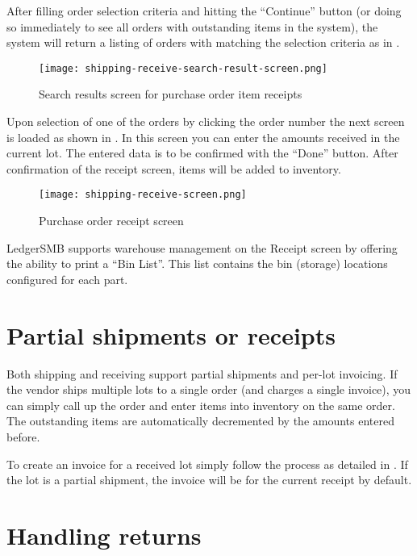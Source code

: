 After filling order selection criteria and hitting the ``Continue'' button (or doing so
immediately to see all orders with outstanding items in the system), the system will return
a listing of orders with matching the selection criteria as in .

\begin{figure}[h]
\centering
\texttt{[image: shipping-receive-search-result-screen.png]}
\caption{Search results screen for purchase order item receipts}
\label{fig:shipping-receive-search-result-screen}
\end{figure}

Upon selection of one of the orders by clicking the order number the next screen is loaded
as shown in . In this screen you can enter the amounts
received in the current lot. The entered data is to be confirmed with the ``Done'' button.
After confirmation of the receipt screen, items will be added to inventory.

\begin{figure}[h]
\centering
\texttt{[image: shipping-receive-screen.png]}
\caption{Purchase order receipt screen}
\label{fig:shipping-receive-screen}
\end{figure}

LedgerSMB supports warehouse management on the Receipt screen by offering the ability to
print a ``Bin List''. This list contains the bin (storage) locations configured for each part.


\section{Partial shipments or receipts}

Both shipping and receiving support partial shipments and per-lot invoicing. If the vendor
ships multiple lots to a single order (and charges a single invoice), you can simply call
up the order and enter items into inventory on the same order. The outstanding items
are automatically decremented by the amounts entered before.

To create an invoice for a received lot simply follow the process as detailed in
. If the lot is a partial shipment, the invoice will be
for the current receipt by default.

\section{Handling returns}


